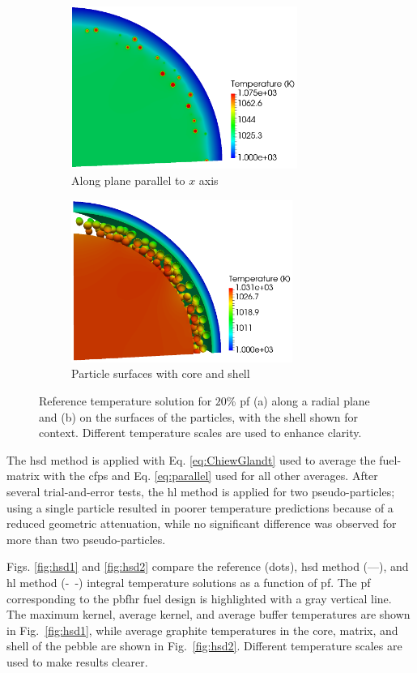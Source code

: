 \begin{figure}[!htb]
\centering
\begin{subfigure}{.475\textwidth}
  \centering
  \includegraphics[height=5.3cm]{figs/pbfhr_16_slice_pf20.png}
  \caption{Along plane parallel to \(x\) axis}
  \label{fig:octant1}
\end{subfigure}
\begin{subfigure}{.475\textwidth}
  \centering
  \includegraphics[height=5.3cm]{figs/pbfhr_16_surfaces_pf20.png}
  \caption{Particle surfaces with core and shell}
  \label{fig:octant2}
\end{subfigure}
\caption{Reference temperature solution for \(20\)\% \gls{pf} (a) along a radial plane and (b) on the surfaces of the particles, with the shell shown for context. Different temperature scales are used to enhance clarity.}
\label{fig:pebble_octant_ref}
\end{figure}

The \gls{hsd} method is applied with Eq. \eqref{eq:ChiewGlandt} used to average the fuel-matrix with the \glspl{cfp} and Eq. \eqref{eq:parallel} used for all other averages. After several trial-and-error tests, the \gls{hl} method is applied for two pseudo-particles; using a single particle resulted in poorer temperature predictions because of a reduced geometric attenuation, while no significant difference was observed for more than two pseudo-particles.

Figs. \ref{fig:hsd1} and \ref{fig:hsd2} compare the reference (dots), \gls{hsd} method (---), and \gls{hl} method \mbox{(- -)} integral temperature solutions as a function of \gls{pf}. The \gls{pf} corresponding to the \gls{pbfhr} fuel design is highlighted with a gray vertical line. The maximum kernel, average kernel, and average buffer temperatures are shown in Fig.\ \ref{fig:hsd1}, while average graphite temperatures in the core, matrix, and shell of the pebble are shown in Fig.\ \ref{fig:hsd2}. Different temperature scales are used to make results clearer.

